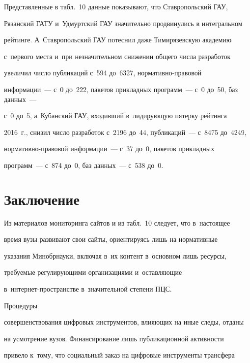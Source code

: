   





  


  Представленные в табл.~10 данные показывают, что Ставропольский ГАУ, 


Рязанский ГАТУ и~Удмуртский ГАУ значительно продвинулись в интегральном 


рейтинге. А~Ставропольский ГАУ потеснил даже Тимирязевскую академию 


с~первого места и~при незначительном снижении общего числа разработок 


увеличил число пуб\-ли\-ка\-ций с~594 до~6327, нор\-ма\-тив\-но-пра\-во\-вой 


информации~--- с~0 до~222, пакетов прикладных программ~--- с~0 до~50, баз данных~--- 


с~0 до~5, а~Кубанский ГАУ, входивший в~лидирующую пятерку рейтинга 


2016~г., снизил чис\-ло разработок с~2196 до~44, публикаций~--- с~8475 до~4249,  


нор\-ма\-тив\-но-пра\-во\-вой информации~--- с~37 до~0, пакетов прикладных 


программ~--- с~874 до~0, баз данных~--- с~538 до~0.





\section{Заключение}





  Из материалов мониторинга сайтов и из табл.~10 следует, что в~настоящее 


время вузы развивают свои сайты, ориентируясь лишь на нормативные 


указания Минобрнауки, включая в~их контент в~основном лишь ресурсы, 


требуемые регулирующими организациями и~оставляющие  


в~ин\-тер\-нет-про\-стран\-ст\-ве в~значительной степени ПЦС. 


Процедуры 


совершенствования цифровых инструментов, влияющих на иные следы, отданы 


на усмотрение вузов. Финансирование лишь пуб\-ли\-ка\-ци\-он\-ной ак\-тив\-ности 


привело к~тому, что социальный заказ на циф\-ро\-вые инструменты трансфера 


